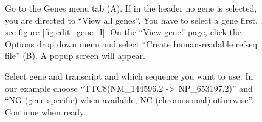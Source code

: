 \begin{figure}[ht]
  \begin{shaded}
	  \caption{Go to the Genes menu tab (A).
	 	If in the header no gene is selected, you are directed to ``View all genes''.  
	 	You have to select a gene first, see figure \ref{fig:edit_gene_I}.
	  On the ``View gene'' page, click the Options drop down menu and select ``Create human-readable refseq file'' (B).
		A popup screen will appear.}
		\label{fig:create_refseq_page_I}
  \end{shaded}
\end{figure}

\begin{figure}[ht]
  \begin{shaded}
	  \caption{Select gene and transcript and which sequence you want to use. 
	  In our example choose ``TTC8(NM\_144596.2 -> NP\_653197.2)'' and ``NG (gene-specific) when available, 
	   NC (chromosomal) otherwise''.
   	Continue when ready.}
		\label{fig:create_refseq_page_II}
  \end{shaded}
\end{figure}

